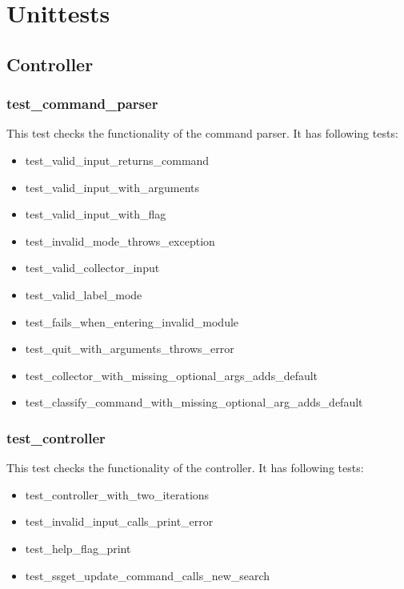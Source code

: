 \documentclass[parskip=full]{scrartcl}
\begin{document}
\section{Unittests}

\subsection{Controller}
\subsubsection{test\_command\_parser}
This test checks the functionality of the command parser.
It has following tests:

\begin{itemize}

\item test\_valid\_input\_returns\_command

\item test\_valid\_input\_with\_arguments

\item test\_valid\_input\_with\_flag

\item test\_invalid\_mode\_throws\_exception

\item test\_valid\_collector\_input

\item test\_valid\_label\_mode

\item test\_fails\_when\_entering\_invalid\_module

\item test\_quit\_with\_arguments\_throws\_error

\item test\_collector\_with\_missing\_optional\_args\_adds\_default

\item test\_classify\_command\_with\_missing\_optional\_arg\_adds\_default

\end{itemize}

\subsubsection{test\_controller}
This test checks the functionality of the controller.
It has following tests:

\begin{itemize}

\item test\_controller\_with\_two\_iterations

\item test\_invalid\_input\_calls\_print\_error

\item test\_help\_flag\_print

\item test\_ssget\_update\_command\_calls\_new\_search

\end{itemize}
\end{document}
